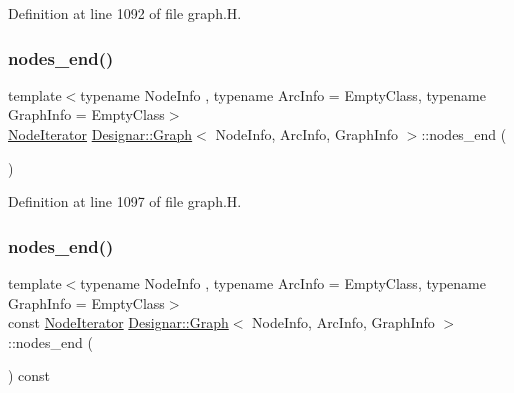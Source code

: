 Definition at line 1092 of file graph.\+H.

\mbox{\label{class_designar_1_1_graph_a9f51b69f8827aabfe5b23f82e9bc5a4d}} 
\subsubsection{\texorpdfstring{nodes\+\_\+end()}{nodes\_end()}\hspace{0.1cm}{\footnotesize\ttfamily [1/2]}}
{\footnotesize\ttfamily template$<$typename Node\+Info , typename Arc\+Info  = Empty\+Class, typename Graph\+Info  = Empty\+Class$>$ \\
\hyperlink{class_designar_1_1_graph_1_1_node_iterator}{Node\+Iterator} \hyperlink{class_designar_1_1_graph}{Designar\+::\+Graph}$<$ Node\+Info, Arc\+Info, Graph\+Info $>$\+::nodes\+\_\+end (\begin{DoxyParamCaption}{ }\end{DoxyParamCaption})\hspace{0.3cm}{\ttfamily [inline]}}



Definition at line 1097 of file graph.\+H.

\mbox{\label{class_designar_1_1_graph_abb7e32a8a05850e788f4017677965b49}} 
\subsubsection{\texorpdfstring{nodes\+\_\+end()}{nodes\_end()}\hspace{0.1cm}{\footnotesize\ttfamily [2/2]}}
{\footnotesize\ttfamily template$<$typename Node\+Info , typename Arc\+Info  = Empty\+Class, typename Graph\+Info  = Empty\+Class$>$ \\
const \hyperlink{class_designar_1_1_graph_1_1_node_iterator}{Node\+Iterator} \hyperlink{class_designar_1_1_graph}{Designar\+::\+Graph}$<$ Node\+Info, Arc\+Info, Graph\+Info $>$\+::nodes\+\_\+end (\begin{DoxyParamCaption}{ }\end{DoxyParamCaption}) const\hspace{0.3cm}{\ttfamily [inline]}}



